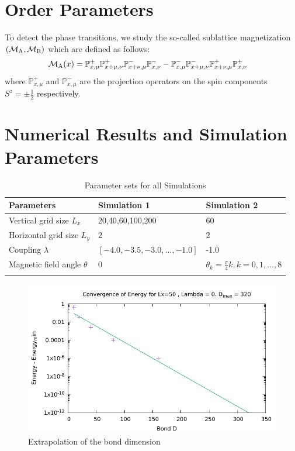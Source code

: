 \documentclass[12pt, a4paper, twoside, titlepage]{article}
\newcommand{\M}[1]{\ensuremath{\mathcal{M}_{\rm #1}}}
\newcommand{\Pp}[1]{\ensuremath{\mathbb{P}^{+}_{#1}}}
\newcommand{\Pm}[1]{\ensuremath{\mathbb{P}^{-}_{#1}}}
\begin{document}
\section{Order Parameters}
 To detect the phase transitions, we study the so-called sublattice
 magnetization $( \M{A}, \M{B})$ which are defined as follows:
 \begin{align}
	 \M{A}(x) &= \Pp{x,\mu} \Pp{x+\mu,\nu} \Pm{x+\nu,\mu} \Pm{x,\nu} -
          \Pm{x,\mu} \Pm{x+\mu,\nu} \Pp{x+\nu,\mu} \Pp{x,\nu}
 \end{align}
 where $\Pp{x,\mu}$ and $\Pm{x,\mu}$ are the projection operators
 on the spin components $S^z = \pm \frac{1}{2}$ respectively.


\newpage
\section{Numerical Results and Simulation Parameters}

\begin{table}[htp!]
\centering
\caption{Parameter sets for all Simulations}
\smallskip
{}
\begin{tabular}{l l l}
\toprule
Parameters & \multicolumn{1}{l}{Simulation 1} & \multicolumn{1}{l}{Simulation 2} \\
\midrule
\rowcolor[gray]{.9}
Vertical grid size $L_x$ & {20,40,60,100,200} & 60\\
Horizontal grid size $L_y$           & 2 & 2 \\
\rowcolor[gray]{.9}
Coupling $\lambda$ & $[-4.0,-3.5,-3.0,\dots,-1.0]$ & -1.0\\
Magnetic field angle $\theta$       & 0 & $\theta_k =\frac{\pi}{4}k, k = 0,1,\dots,8$ \\
\rowcolor[gray]{.9}
\bottomrule
\end{tabular}
\end{table}

\begin{figure}[htp!]
  \includegraphics{../DMRG_QLM/data/extrapolation_in_bond_D/L_50/plot_extrapolation_in_bond_D_L_50_lam_0.pdf}
  \caption{Extrapolation of the bond dimension}
  \label{}
\end{figure}
\end{document}
